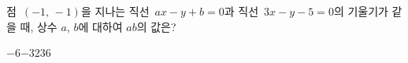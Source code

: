 점~$(-1,\,-1)$을 지나는 직선~$ax-y+b=0$과 직선~$3x-y-5=0$의 기울기가 같을 때, 상수 $a$, $b$에 대하여 $ab$의 값은?
\begin{choices32}{$-6$}{$-3$}{$2$}{$3$}{$6$}\end{choices32}
